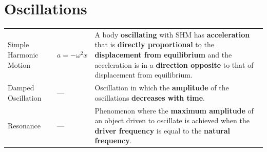\documentclass[a4paper,11pt]{article}
\begin{document}
	\section{Oscillations}
		\begin{center}
			\renewcommand{\arraystretch}{1.2}
			\begin{tabular}{@{} l l p{8cm} @{}}
				\toprule
				Simple Harmonic Motion & $a=-\omega^2x$ & A body \textbf{oscillating} with SHM has \textbf{acceleration} that is \textbf{directly proportional} to the \textbf{displacement from equilibrium} and the acceleration is in a \textbf{direction opposite} to that of displacement from equilibrium. \\
				Damped Oscillation & ---  & Oscillation in which the  \textbf{amplitude} of the oscillations \textbf{decreases with time}. \\
				Resonance & --- & Phenomenon where the \textbf{maximum amplitude} of an object driven to oscillate is achieved when the \textbf{driver frequency} is equal to the \textbf{natural frequency}. \\
				\bottomrule
			\end{tabular}
		\end{center}
\end{document}
